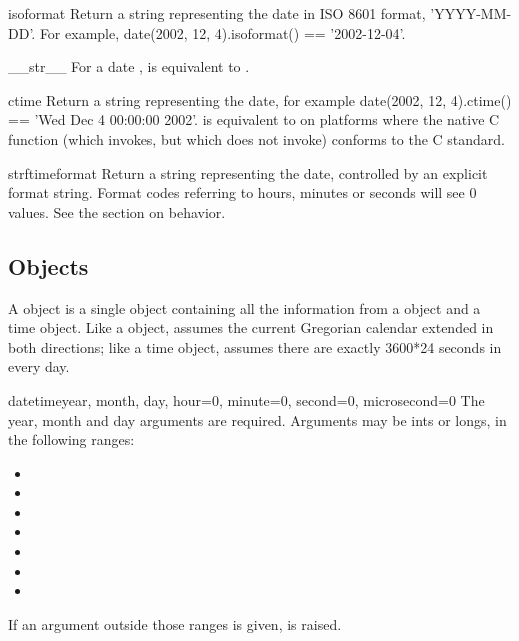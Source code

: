 \begin{methoddesc}{isoformat}{}
    Return a string representing the date in ISO 8601 format,
    'YYYY-MM-DD'.  For example,
    date(2002, 12, 4).isoformat() == '2002-12-04'.
\end{methoddesc}
\begin{methoddesc}{__str__}{}
    For a date ,  is equivalent to
    .
\end{methoddesc}
\begin{methoddesc}{ctime}{}
    Return a string representing the date, for example
    date(2002, 12, 4).ctime() == 'Wed Dec  4 00:00:00 2002'.
     is equivalent to
    on platforms where the native C  function
    (which  invokes, but which
     does not invoke) conforms to the C standard.
\end{methoddesc}
\begin{methoddesc}{strftime}{format}
    Return a string representing the date, controlled by an explicit
    format string.  Format codes referring to hours, minutes or seconds
    will see 0 values.
    See the section on  behavior.
\end{methoddesc}


\subsection{ Objects \label{datetime-datetime}}

A  object is a single object containing all the
information from a  object and a time object.  Like a
 object,  assumes the current Gregorian
calendar extended in both directions; like a time object,
 assumes there are exactly 3600*24 seconds in every
day.

\begin{funcdesc}{datetime}{year, month, day,
             hour=0, minute=0, second=0, microsecond=0}
The year, month and day arguments are required.  Arguments may be ints
or longs, in the following ranges:

\begin{itemize}
  \item {}
  \item {}
  \item {}
  \item {}
  \item {}
  \item {}
  \item {}
\end{itemize}

If an argument outside those ranges is given,
 is raised.
\end{funcdesc}


